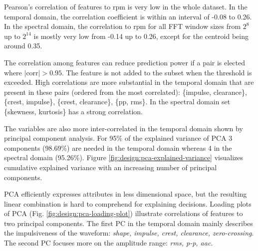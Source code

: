 Pearson's correlation of features to rpm is very low in the whole dataset. In the temporal domain, the correlation coefficient is within an interval of -0.08 to 0.26. In the spectral domain, the correlation to rpm for all FFT window sizes from $2^8$ up to $2^{14}$ is mostly very low from -0.14 up to 0.26, except for the centroid being around 0.35.

The correlation among features can reduce prediction power if a pair is elected where $|\mathrm{corr}| > 0.95$. The feature is not added to the subset when the threshold is exceeded. High correlations are more substantial in the temporal domain that are present in these pairs (ordered from the most correlated): \{impulse, clearance\}, \{crest, impulse\}, \{crest, clearance\}, \{pp, rms\}. In the spectral domain set \{skewness, kurtosis\} has a strong correlation.


The variables are also more inter-correlated in the temporal domain shown by principal component analysis. For 95\% of the explained variance of PCA 3 components (98.69\%) are needed in the temporal domain whereas 4 in the spectral domain (95.26\%). Figure \ref{fig:design:pca-explained-variance} visualizes cumulative explained variance with an increasing number of principal components. 


PCA efficiently expresses attributes in less dimensional space, but the resulting linear combination is hard to comprehend for explaining decisions. Loading plots of PCA (Fig. \ref{fig:design:pca-loading-plot}) illustrate correlations of features to two principal components. The first PC in the temporal domain mainly describes the impulsiveness of the waveform: \emph{shape, impulse, crest, clearance, zero-crossing}. The second PC focuses more on the amplitude range: \emph{rms, p-p, aac}.  

